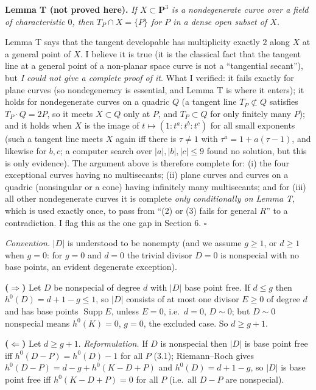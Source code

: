 \documentclass[11pt]{article}
\begin{document}
\medskip
\noindent\textbf{Lemma T (not proved here).} \emph{If $X\subset\mathbf P^3$ is a nondegenerate curve over a field of characteristic $0$, then $T_P\cap X=\{P\}$ for $P$ in a dense open subset of $X$.}
\medskip

Lemma T says that the tangent developable has multiplicity exactly $2$ along $X$ at a general point of $X$. I believe it is true (it is the classical fact that the tangent line at a general point of a non-planar space curve is not a ``tangential secant''), but \emph{I could not give a complete proof of it}. What I verified: it fails exactly for plane curves (so nondegeneracy is essential, and Lemma T is where it enters); it holds for nondegenerate curves on a quadric $Q$ (a tangent line $T_P\not\subset Q$ satisfies $T_P\cdot Q=2P$, so it meets $X\subset Q$ only at $P$, and $T_P\subset Q$ for only finitely many $P$); and it holds when $X$ is the image of $t\mapsto(1:t^a:t^b:t^c)$ for all small exponents (such a tangent line meets $X$ again iff there is $\tau\ne1$ with $\tau^a=1+a(\tau-1)$, and likewise for $b,c$; a computer search over $|a|,|b|,|c|\le9$ found no solution, but this is only evidence). The argument above is therefore complete for: (i) the four exceptional curves having no multisecants; (ii) plane curves and curves on a quadric (nonsingular or a cone) having infinitely many multisecants; and for (iii) all other nondegenerate curves it is complete \emph{only conditionally on Lemma T}, which is used exactly once, to pass from ``(2) or (3) fails for general $R$'' to a contradiction. I flag this as the one gap in Section 6. \hfill$\square$

\pf
\emph{Convention.} $|D|$ is understood to be nonempty (and we assume $g\ge1$, or $d\ge1$ when $g=0$: for $g=0$ and $d=0$ the trivial divisor $D=0$ is nonspecial with no base points, an evident degenerate exception).

\textbf{($\Rightarrow$)} Let $D$ be nonspecial of degree $d$ with $|D|$ base point free. If $d\le g$ then $h^0(D)=d+1-g\le1$, so $|D|$ consists of at most one divisor $E\ge0$ of degree $d$ and has base points $\operatorname{Supp}E$, unless $E=0$, i.e.\ $d=0$, $D\sim0$; but $D\sim0$ nonspecial means $h^0(K)=0$, $g=0$, the excluded case. So $d\ge g+1$.

\textbf{($\Leftarrow$)} Let $d\ge g+1$. \emph{Reformulation.} If $D$ is nonspecial then $|D|$ is base point free iff $h^0(D-P)=h^0(D)-1$ for all $P$ (3.1); Riemann--Roch gives $h^0(D-P)=d-g+h^0(K-D+P)$ and $h^0(D)=d+1-g$, so $|D|$ is base point free iff $h^0(K-D+P)=0$ for all $P$ (i.e.\ all $D-P$ are nonspecial).
\end{document}
